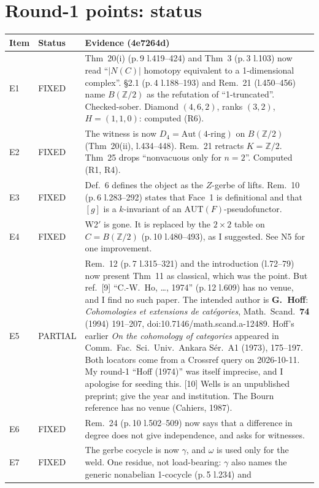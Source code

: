 \documentclass[11pt]{article}
\newcommand{\Z}{\mathbb{Z}}
\newcommand{\Aut}{\mathrm{Aut}}
\begin{document}
\section{Round-1 points: status}
\begin{center}
\small
\begin{tabular}{@{}p{1.1cm}p{2.0cm}p{12.2cm}@{}}
\toprule
Item & Status & Evidence (4e7264d)\\
\midrule
E1 & FIXED & Thm~20(i) (p.\,9 l.419--424) and Thm~3 (p.\,3 l.103) now read ``$|N(C)|$ homotopy
equivalent to a 1-dimensional complex''. §2.1 (p.\,4 l.188--193) and Rem.~21 (l.450--456) name
$B(\Z/2)$ as the refutation of ``1-truncated''. Checked-sober. Diamond $(4,6,2)$, ranks $(3,2)$,
$H=(1,1,0)$: computed (R6).\\
E2 & FIXED & The witness is now $D_4=\Aut(\text{4-ring})$ on $B(\Z/2)$ (Thm~20(ii), l.434--448).
Rem.~21 retracts $K=\Z/2$. Thm~25 drops ``nonvacuous only for $n=2$''. Computed (R1, R4).\\
E3 & FIXED & Def.~6 defines the object as the $Z$-gerbe of lifts. Rem.~10 (p.\,6 l.283--292) states
that Face~1 is definitional and that $[g]$ is a $k$-invariant of an $\mathrm{AUT}(F)$-pseudofunctor.\\
E4 & FIXED & W2$'$ is gone. It is replaced by the $2\times2$ table on $C=B(\Z/2)$ (p.\,10
l.480--493), as I suggested. See N5 for one improvement.\\
E5 & PARTIAL & Rem.~12 (p.\,7 l.315--321) and the introduction (l.72--79) now present Thm~11 as
classical, which was the point. But ref.~[9] ``C.-W.~Ho, \dots, 1974'' (p.\,12 l.609) has no venue,
and I find no such paper. The intended author is \textbf{G.~Hoff}: \emph{Cohomologies et extensions
de cat\'egories}, Math.\ Scand.\ \textbf{74} (1994) 191--207, doi:10.7146/math.scand.a-12489. Hoff's
earlier \emph{On the cohomology of categories} appeared in Comm.\ Fac.\ Sci.\ Univ.\ Ankara S\'er.\
A1 (1973), 175--197. Both locators come from a Crossref query on 2026-10-11. My round-1 ``Hoff
(1974)'' was itself imprecise, and I apologise for seeding this. [10] Wells is an unpublished
preprint; give the year and institution. The Bourn reference has no venue (Cahiers, 1987).\\
E6 & FIXED & Rem.~24 (p.\,10 l.502--509) now says that a difference in degree does not give
independence, and asks for witnesses.\\
E7 & FIXED & The gerbe cocycle is now $\gamma$, and $\omega$ is used only for the weld. One
residue, not load-bearing: $\gamma$ also names the generic nonabelian 1-cocycle (p.\,5 l.234) and

\end{tabular}
\end{center}
\end{document}
